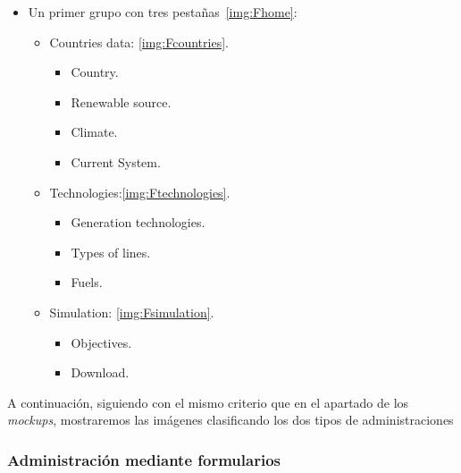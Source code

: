 \begin{itemize}
	
	\item Un primer grupo con tres pestañas~\ref{img:Fhome}:
	
	\begin{itemize}
		
		\item Countries data: \ref{img:Fcountries}. 
		
		\begin{itemize}
			
			\item Country.
			\item Renewable source.
			\item Climate.
			\item Current System.
			
		\end{itemize}
		
		\item Technologies:\ref{img:Ftechnologies}.
		
		\begin{itemize}
			
			\item Generation technologies.
			\item Types of lines.
			\item Fuels.
			
		\end{itemize}
		
		\item Simulation: \ref{img:Fsimulation}.
		
		\begin{itemize}
			
			\item Objectives.
			\item Download.
			
		\end{itemize}
		
	\end{itemize}
	
\end{itemize}

A continuación, siguiendo con el mismo criterio que en el apartado de los \textit{mockups}, mostraremos las imágenes clasificando los dos tipos de administraciones

\subsubsection{Administración mediante formularios} 

